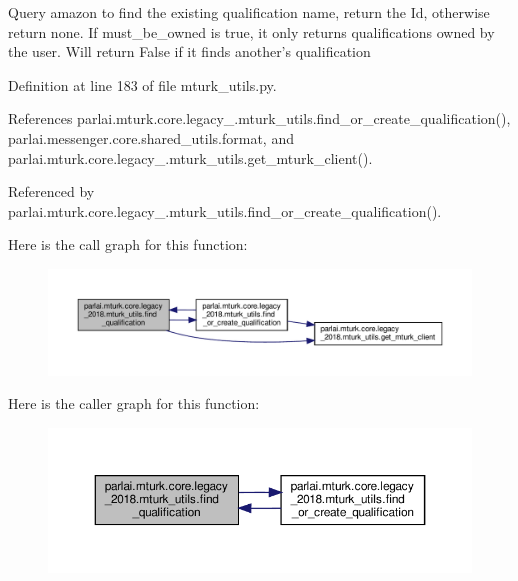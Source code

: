 \begin{DoxyVerb}Query amazon to find the existing qualification name, return the Id,
otherwise return none.
If must_be_owned is true, it only returns qualifications owned by the user.
Will return False if it finds another's qualification
\end{DoxyVerb}
 

Definition at line 183 of file mturk\+\_\+utils.\+py.



References parlai.\+mturk.\+core.\+legacy\+\_.\+mturk\+\_\+utils.\+find\+\_\+or\+\_\+create\+\_\+qualification(), parlai.\+messenger.\+core.\+shared\+\_\+utils.\+format, and parlai.\+mturk.\+core.\+legacy\+\_.\+mturk\+\_\+utils.\+get\+\_\+mturk\+\_\+client().



Referenced by parlai.\+mturk.\+core.\+legacy\+\_.\+mturk\+\_\+utils.\+find\+\_\+or\+\_\+create\+\_\+qualification().

Here is the call graph for this function\+:
\nopagebreak
\begin{figure}[H]
\begin{center}
\leavevmode
\includegraphics[width=350pt]{namespaceparlai_1_1mturk_1_1core_1_1legacy__2018_1_1mturk__utils_ad152f1d9ea255ea9f365695f56e0cc5f_cgraph}
\end{center}
\end{figure}
Here is the caller graph for this function\+:
\nopagebreak
\begin{figure}[H]
\begin{center}
\leavevmode
\includegraphics[width=350pt]{namespaceparlai_1_1mturk_1_1core_1_1legacy__2018_1_1mturk__utils_ad152f1d9ea255ea9f365695f56e0cc5f_icgraph}
\end{center}
\end{figure}
\mbox{\label{namespaceparlai_1_1mturk_1_1core_1_1legacy__2018_1_1mturk__utils_a9999d5b551e569fe3ddd368e4e659b65}} 
